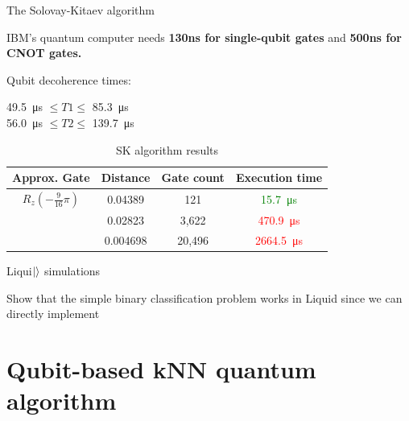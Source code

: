 \documentclass[10pt]{beamer}
\begin{document}
{
\begin{frame}{The Solovay-Kitaev algorithm}


IBM's quantum computer needs \textbf{130ns for single-qubit gates} and \textbf{500ns for CNOT gates.}

Qubit decoherence times:

\SI{49.5}{\micro\second} $\leq T1 \leq$ \SI{85.3}{\micro\second}\\
\SI{56.0}{\micro\second} $\leq T2 \leq$ \SI{139.7}{\micro\second}
\vspace{6mm}
\begin{table}
    \begin{tabular}{c| c |c |c}
      \toprule
      Approx. Gate & Distance & Gate count & Execution time\\
      \midrule
      $R_z(-\frac{9}{16}\pi)$ & 0.04389 & 121 & \textcolor{green}{\SI{15.7}{\micro\second}}\\
       & 0.02823 & 3,622 & \textcolor{red}{\SI{470.9}{\micro\second}}\\
       & 0.004698 & 20,496 & \textcolor{red}{\SI{2664.5}{\micro\second}}\\
      \bottomrule
    \end{tabular}
    \caption{SK algorithm results}
  \end{table}

\end{frame}
}

{
\begin{frame}{Liqui$\ket{}$ simulations}
	
Show that the simple binary classification problem works in Liquid since we can directly implement 	
	
\end{frame}
}

\section{Qubit-based kNN quantum algorithm}
\end{document}
